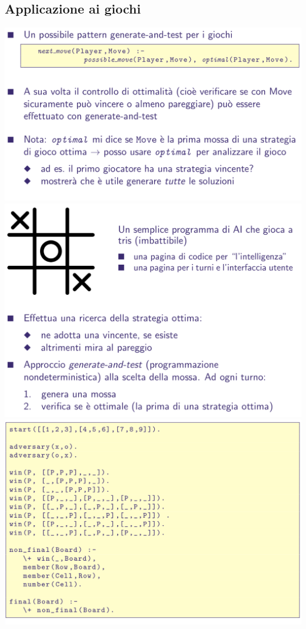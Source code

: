 \documentclass[10pt]{article}
\begin{document}
\subsection{Applicazione ai giochi}
\includegraphics[scale=0.25]{Immagini/pl43.png}
\\
\includegraphics[scale=0.25]{Immagini/pl44.png}
\\
\includegraphics[scale=0.25]{Immagini/pl45.png}
\end{document}
